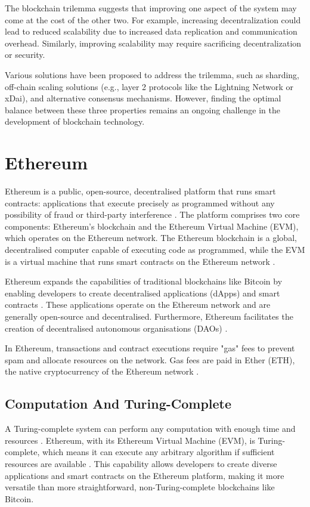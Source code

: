 The blockchain trilemma suggests that improving one aspect of the system may come at the cost of the other two. For example, increasing decentralization could lead to reduced scalability due to increased data replication and communication overhead. Similarly, improving scalability may require sacrificing decentralization or security.

Various solutions have been proposed to address the trilemma, such as sharding, off-chain scaling solutions (e.g., layer 2 protocols like the Lightning Network or xDai), and alternative consensus mechanisms. However, finding the optimal balance between these three properties remains an ongoing challenge in the development of blockchain technology.

\section{Ethereum}
Ethereum is a public, open-source, decentralised platform that runs smart contracts: applications that execute precisely as programmed without any possibility of fraud or third-party interference \cite{buterin2013ethereum}. The platform comprises two core components: Ethereum's blockchain and the Ethereum Virtual Machine (EVM), which operates on the Ethereum network. The Ethereum blockchain is a global, decentralised computer capable of executing code as programmed, while the EVM is a virtual machine that runs smart contracts on the Ethereum network \cite{wood2014ethereum}.

Ethereum expands the capabilities of traditional blockchains like Bitcoin by enabling developers to create decentralised applications (dApps) and smart contracts \cite{swan2015blockchain}. These applications operate on the Ethereum network and are generally open-source and decentralised. Furthermore, Ethereum facilitates the creation of decentralised autonomous organisations (DAOs) \cite{mougayar2016business}.

In Ethereum, transactions and contract executions require "gas" fees to prevent spam and allocate resources on the network. Gas fees are paid in Ether (ETH), the native cryptocurrency of the Ethereum network \cite{antonopoulos2018mastering}.

\subsection{Computation And Turing-Complete}
A Turing-complete system can perform any computation with enough time and resources \cite{turing1936computable}. Ethereum, with its Ethereum Virtual Machine (EVM), is Turing-complete, which means it can execute any arbitrary algorithm if sufficient resources are available \cite{buterin2013ethereum}. This capability allows developers to create diverse applications and smart contracts on the Ethereum platform, making it more versatile than more straightforward, non-Turing-complete blockchains like Bitcoin.

